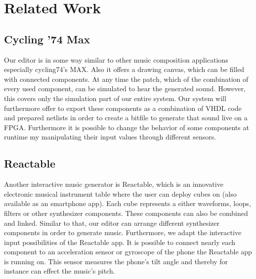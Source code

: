 \chapter{Related Work}
\label{chapter:RelatedWork}
	 
\section{Cycling '74 Max}
	Our editor is in some way similar to other music composition applications especially cycling74's MAX. Also it offers a drawing canvas, which can be filled with connected components. At any time the patch, which of the combination of every used component, can be simulated to hear the generated sound. However, this covers only the simulation part of our entire system.
	Our system will furthermore offer to export these components as a combination of VHDL code and prepared netlists in order to create a bitfile to generate that sound live on a FPGA. Furthermore it is possible to change the behavior of some components at runtime my manipulating their input values through different sensors. 

\section{Reactable}

Another interactive music generator is Reactable, which is an innovative electronic musical instrument table where the user can deploy cubes on (also available as an smartphone app). Each cube represents a either waveforms, loops, filters or other synthesizer components. These components can also be combined and linked. Similar to that, our editor can arrange different synthesizer components in order to generate music. Furthermore, we adapt the interactive input possibilities of the Reactable app. It is possible to connect nearly each component to an acceleration sensor or gyroscope of the phone the Reactable app is running on. This sensor measures the phone's tilt angle and thereby for instance can effect the music's pitch.